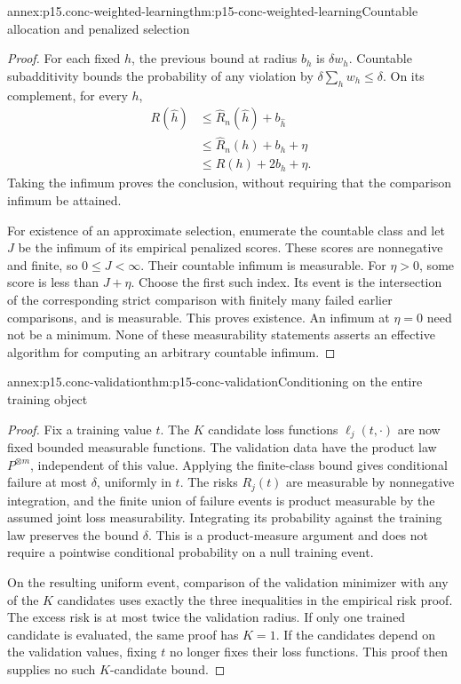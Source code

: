 \begin{annexitem}{annex:p15.conc-weighted-learning}{thm:p15-conc-weighted-learning}{Countable allocation and penalized selection}
\begin{proof}
For each fixed \(h\), the previous bound at radius \(b_h\)
is \(\delta w_h\). Countable subadditivity bounds the
probability of any violation by
\(\delta\sum_hw_h\leq\delta\).
On its complement, for every \(h\),
\[
 \begin{split}
 R(\widehat h)
 &\leq\widehat R_n(\widehat h)+b_{\widehat h}\\
 &\leq\widehat R_n(h)+b_h+\eta\\
 &\leq R(h)+2b_h+\eta.
 \end{split}
\]
Taking the infimum proves the conclusion, without
requiring that the comparison infimum be attained.

For existence of an approximate selection, enumerate
the countable class and let \(J\) be the infimum of
its empirical penalized scores. These scores are
nonnegative and finite, so \(0\leq J<\infty\).
Their countable infimum is measurable.
For \(\eta>0\), some score is less than \(J+\eta\).
Choose the first such index. Its event is the
intersection of the corresponding strict comparison
with finitely many failed earlier comparisons,
and is measurable. This proves existence.
An infimum at \(\eta=0\) need not be a minimum.
None of these measurability statements asserts an
effective algorithm for computing an arbitrary
countable infimum.
\end{proof}
\end{annexitem}

\begin{annexitem}{annex:p15.conc-validation}{thm:p15-conc-validation}{Conditioning on the entire training object}
\begin{proof}
Fix a training value \(t\). The \(K\) candidate loss
functions \(\ell_j(t,\cdot)\) are now fixed bounded
measurable functions. The validation data have the
product law \(P^{\otimes m}\), independent of this value.
Applying the finite-class bound gives conditional
failure at most \(\delta\), uniformly in \(t\).
The risks \(R_j(t)\) are measurable by nonnegative
integration, and the finite union of failure events
is product measurable by the assumed joint loss
measurability. Integrating its probability against
the training law preserves the bound \(\delta\).
This is a product-measure argument and does not
require a pointwise conditional probability on a
null training event.

On the resulting uniform event, comparison of the
validation minimizer with any of the \(K\) candidates
uses exactly the three inequalities in the empirical
risk proof. The excess risk is at most twice the
validation radius. If only one trained candidate
is evaluated, the same proof has \(K=1\).
If the candidates depend on the validation values,
fixing \(t\) no longer fixes their loss functions.
This proof then supplies no such \(K\)-candidate bound.
\end{proof}
\end{annexitem}

